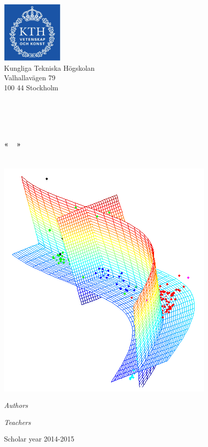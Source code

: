 \begin{center}
	\begin{minipage}[t]{0.48\textwidth}
	  \begin{flushleft}
	    \includegraphics [width=30mm]{img/logo_kth.jpg} \\[0.1cm]
		Kungliga Tekniska Högskolan\\
		Valhallavägen 79\\
		100 44 Stockholm
	  \end{flushleft}
	\end{minipage}
	\begin{minipage}[t]{0.48\textwidth}
	  \begin{flushright}
	  \end{flushright}
	\end{minipage} \\[1cm]

	\textsc{\Large \reportsubject}\\[0.3cm]
	\HRule \\[0.4cm]
	{\Huge \bfseries \reporttitle}\\[0.3cm]
	{\LARGE \bfseries «~\stagetopic~»}\\[0.3cm]
	{\Large \dateperiod}\\[0.4cm]
	\HRule \\[1cm]

	\includegraphics [width=0.4\linewidth]{img/icon.png} \\[0.7cm]
	\begin{minipage}[t]{0.5\textwidth}
	  \begin{flushleft} \large
	    \emph{Authors}\\
	    \reportauthor
	  \end{flushleft}
	\end{minipage}
	\begin{minipage}[t]{0.4\textwidth}
	  \begin{flushright} \large
	    \emph{Teachers} \\
	    \enseignants
	  \end{flushright}
	\end{minipage}

	\vfill
	\footnotesize{Scholar year 2014-2015}
\end{center}
